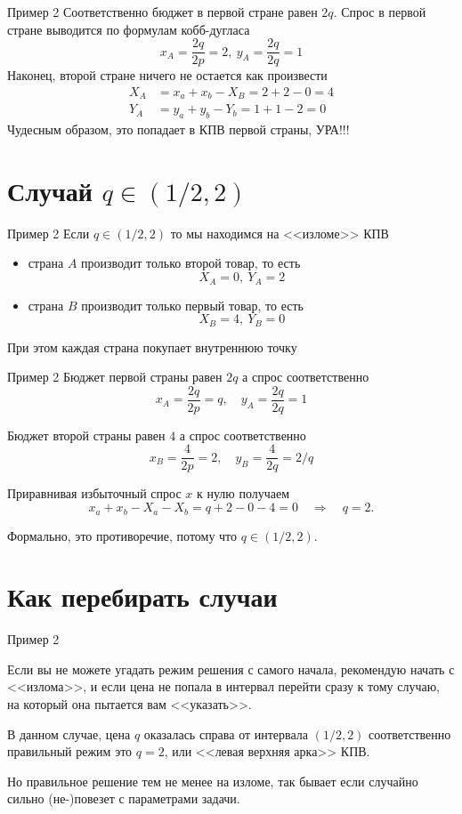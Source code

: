 \documentclass{beamer}
\begin{document}
\begin{frame}{Пример 2}
Соответственно бюджет в первой стране равен $2q$. Спрос в первой стране выводится по формулам кобб-дугласа $$x_A = \frac{2q}{2p} = 2, \ y_A = \frac{2q}{2q} = 1 $$
Наконец, второй стране ничего не остается как произвести
\begin{align*}
	X_A & = x_a + x_b - X_B = 2 + 2 - 0 = 4\\
	Y_A & = y_a + y_b - Y_b = 1 + 1 - 2 = 0 
\end{align*}
Чудесным образом, это попадает в КПВ первой страны, УРА!!!
\end{frame}

\section{Случай $q \in (1/2,2)$}

\begin{frame}{Пример 2}
Если $q \in (1/2,2)$ то мы находимся на <<изломе>> КПВ
\begin{itemize}
  \item страна $A$ производит только второй товар, то есть
 $$X_A = 0, \ Y_A = 2$$
  \item страна $B$ производит только первый товар, то есть
 $$X_B = 4, \ Y_B = 0$$
\end{itemize}
При этом каждая страна покупает внутреннюю точку
\end{frame}

\begin{frame}{Пример 2}
Бюджет первой страны равен $2q$ а спрос соответственно
$$x_A = \frac{2q}{2p} = q, \quad y_A = \frac{2q}{2q} = 1 $$

Бюджет второй страны равен $4$ а спрос соответственно
$$x_B = \frac{4}{2p} = 2, \quad y_B = \frac{4}{2q} = 2/q $$

Приравнивая избыточный спрос $x$ к нулю получаем 
$$x_a + x_b - X_a - X_b = q + 2 - 0 - 4 = 0 \quad \Rightarrow \quad q = 2.$$

Формально, это противоречие, потому что $q \in (1/2,2)$.

\end{frame}

\section{Как перебирать случаи}

\begin{frame}{Пример 2}

Если вы не можете угадать режим решения с самого начала, рекомендую начать с <<излома>>, и если цена не попала в интервал перейти сразу к тому случаю, на который она пытается вам <<указать>>.

В данном случае, цена $q$ оказалась справа от интервала $(1/2,2)$ соответственно правильный режим это $q = 2$, или <<левая верхняя арка>> КПВ.

Но правильное решение тем не менее на изломе, так бывает если случайно сильно (не-)повезет с параметрами задачи.
\end{frame}
\end{document}
